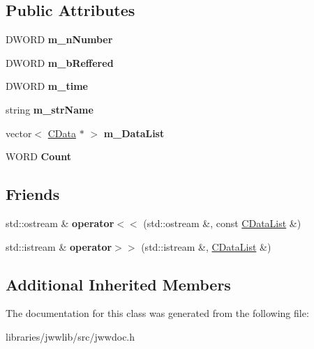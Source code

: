 \subsection*{Public Attributes}
\begin{DoxyCompactItemize}
\item 
\hypertarget{classCDataList_a530ccd8b2496184520930e824e56f10f}{D\-W\-O\-R\-D {\bfseries m\-\_\-n\-Number}}\label{classCDataList_a530ccd8b2496184520930e824e56f10f}

\item 
\hypertarget{classCDataList_ab509e290ce676ca50d59f433e1d432fc}{D\-W\-O\-R\-D {\bfseries m\-\_\-b\-Reffered}}\label{classCDataList_ab509e290ce676ca50d59f433e1d432fc}

\item 
\hypertarget{classCDataList_a0bb42fd17b046e77c2da74eda0a20d3d}{D\-W\-O\-R\-D {\bfseries m\-\_\-time}}\label{classCDataList_a0bb42fd17b046e77c2da74eda0a20d3d}

\item 
\hypertarget{classCDataList_a40c36a9657141ed8847c0b78af6f48e1}{string {\bfseries m\-\_\-str\-Name}}\label{classCDataList_a40c36a9657141ed8847c0b78af6f48e1}

\item 
\hypertarget{classCDataList_a2aa4ffdf82572b4afa38d87b00b0fba2}{vector$<$ \hyperlink{classCData}{C\-Data} $\ast$ $>$ {\bfseries m\-\_\-\-Data\-List}}\label{classCDataList_a2aa4ffdf82572b4afa38d87b00b0fba2}

\item 
\hypertarget{classCDataList_a8f422a373b45f20f22372ae4c065ce0d}{W\-O\-R\-D {\bfseries Count}}\label{classCDataList_a8f422a373b45f20f22372ae4c065ce0d}

\end{DoxyCompactItemize}
\subsection*{Friends}
\begin{DoxyCompactItemize}
\item 
\hypertarget{classCDataList_a502cedf3c53b2dda4b689229e2153212}{std\-::ostream \& {\bfseries operator$<$$<$} (std\-::ostream \&, const \hyperlink{classCDataList}{C\-Data\-List} \&)}\label{classCDataList_a502cedf3c53b2dda4b689229e2153212}

\item 
\hypertarget{classCDataList_a7aebe57a3ea4ebe37776bd9c5a374afd}{std\-::istream \& {\bfseries operator$>$$>$} (std\-::istream \&, \hyperlink{classCDataList}{C\-Data\-List} \&)}\label{classCDataList_a7aebe57a3ea4ebe37776bd9c5a374afd}

\end{DoxyCompactItemize}
\subsection*{Additional Inherited Members}


The documentation for this class was generated from the following file\-:\begin{DoxyCompactItemize}
\item 
libraries/jwwlib/src/jwwdoc.\-h\end{DoxyCompactItemize}
